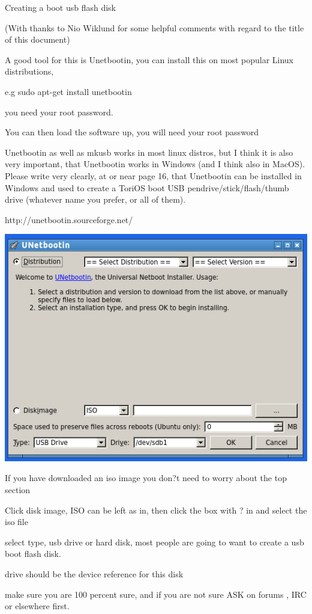 \documentclass[12pt,a4paper]{book}
\begin{document}
Creating a boot usb flash disk

(With thanks to Nio Wiklund for some helpful comments with regard to the title of this document)

A good tool for this is Unetbootin,  you can install this on most popular Linux distributions,

e.g sudo apt-get install unetbootin

you need your root password.

You can then load the software up, you will need your root password

Unetbootin as well as mkusb works in most linux distros, but I think
it is also very important, that Unetbootin works in Windows (and I
think also in MacOS). Please write very clearly, at or near page 16,
that Unetbootin can be installed in Windows and used to create a
ToriOS boot USB pendrive/stick/flash/thumb drive (whatever name you
prefer, or all of them).

http://unetbootin.sourceforge.net/

\newpage




\begin{center}
\includegraphics[width=0.7\linewidth]{unetbootin} 
\end{center}


If you have downloaded an iso image  you don?t need to worry about the top section

Click disk image,  ISO can be left as in,  then click the box with ? in and select the iso file

select type, usb drive or hard disk,  most people are going to want to create a usb boot flash disk.

drive should be the device reference for this disk

make sure you are 100 percent sure,  and if you are not sure ASK on forums , IRC or elsewhere first.
\end{document}
